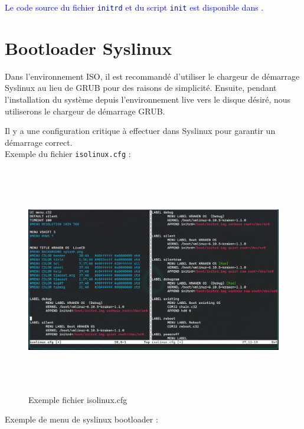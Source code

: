 \noindent
\textcolor{blue}{Le code source du fichier \texttt{initrd} et du script \texttt{init} est disponible dans \cite{initrd}.}


\section{Bootloader Syslinux}

Dans l'environnement ISO, il est recommandé d'utiliser le chargeur de démarrage Syslinux au lieu de GRUB pour des raisons de simplicité. Ensuite, pendant l'installation du système depuis l'environnement live vers le disque désiré, nous utiliserons le chargeur de démarrage GRUB. 

Il y a une configuration critique à effectuer dans Syslinux pour garantir un démarrage correct.\\
Exemple du fichier \texttt{isolinux.cfg} :

\begin{figure}[H]
  \centering
  \includegraphics[width=1\textwidth, height=10cm]{images_pfe/cfgisolinuxcorrect.png}
  \caption{Exemple fichier isolinux.cfg }
  \label{fig:isolinux}
\end{figure}

Exemple de menu de syslinux bootloader :

